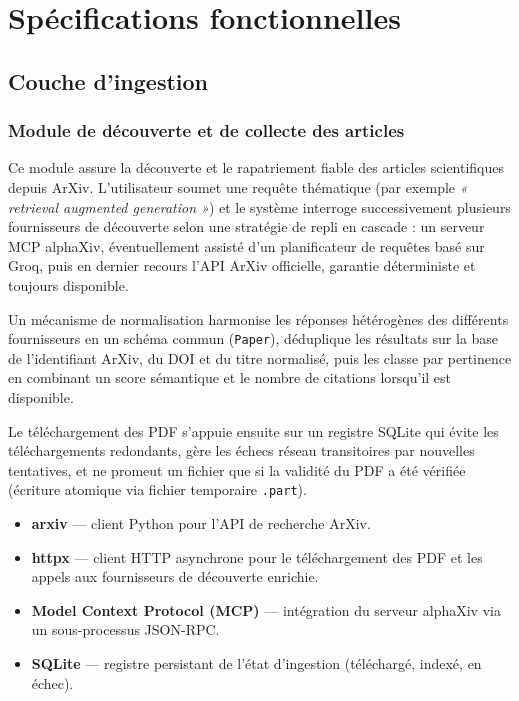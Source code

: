 \section{Spécifications fonctionnelles}

\subsection{Couche d'ingestion}

\subsubsection{Module de découverte et de collecte des articles}

Ce module assure la découverte et le rapatriement fiable des articles scientifiques
depuis ArXiv. L'utilisateur soumet une requête thématique (par exemple
\textit{« retrieval augmented generation »}) et le système interroge successivement
plusieurs fournisseurs de découverte selon une stratégie de repli en cascade : un
serveur MCP alphaXiv, éventuellement assisté d'un planificateur de requêtes basé sur
Groq, puis en dernier recours l'API ArXiv officielle, garantie déterministe et
toujours disponible.

Un mécanisme de normalisation harmonise les réponses hétérogènes des différents
fournisseurs en un schéma commun (\texttt{Paper}), déduplique les résultats sur la
base de l'identifiant ArXiv, du DOI et du titre normalisé, puis les classe par
pertinence en combinant un score sémantique et le nombre de citations lorsqu'il est
disponible.

Le téléchargement des PDF s'appuie ensuite sur un registre SQLite qui évite les
téléchargements redondants, gère les échecs réseau transitoires par nouvelles
tentatives, et ne promeut un fichier que si la validité du PDF a été vérifiée
(écriture atomique via fichier temporaire \texttt{.part}).

\begin{encadre}
\begin{itemize}
  \item \textbf{arxiv} — client Python pour l'API de recherche ArXiv.
  \item \textbf{httpx} — client HTTP asynchrone pour le téléchargement des PDF et les
        appels aux fournisseurs de découverte enrichie.
  \item \textbf{Model Context Protocol (MCP)} — intégration du serveur alphaXiv via un
        sous-processus JSON-RPC.
  \item \textbf{SQLite} — registre persistant de l'état d'ingestion (téléchargé, indexé,
        en échec).
\end{itemize}
\end{encadre}

